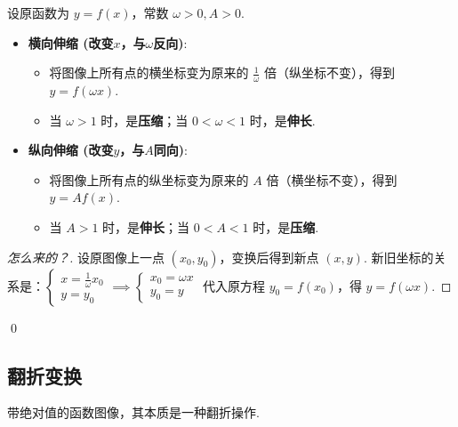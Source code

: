 \begin{theorem}[伸缩变换法则]
	设原函数为 $y=f(x)$，常数 $\omega>0, A>0$.
	\begin{itemize}
		\item \textbf{横向伸缩 (改变$x$，与$\omega$反向)}:
		\begin{itemize}
			\item 将图像上所有点的横坐标变为原来的 $\frac{1}{\omega}$ 倍（纵坐标不变），得到 $y=f(\omega x)$.
			\item 当 $\omega>1$ 时，是\textbf{压缩}；当 $0<\omega<1$ 时，是\textbf{伸长}.
		\end{itemize}
		\item \textbf{纵向伸缩 (改变$y$，与$A$同向)}:
		\begin{itemize}
			\item 将图像上所有点的纵坐标变为原来的 $A$ 倍（横坐标不变），得到 $y=A f(x)$.
			\item 当 $A>1$ 时，是\textbf{伸长}；当 $0<A<1$ 时，是\textbf{压缩}.
		\end{itemize}
	\end{itemize}
\end{theorem}
\begin{proof}[怎么来的？]
	设原图像上一点 $(x_0, y_0)$，变换后得到新点 $(x,y)$.
	新旧坐标的关系是：$\begin{cases} x = \frac{1}{\omega}x_0 \\ y = y_0 \end{cases} \implies \begin{cases} x_0 = \omega x \\ y_0 = y \end{cases}$
	代入原方程 $y_0=f(x_0)$，得 $y=f(\omega x)$.
\end{proof}
\qed

\subsection{翻折变换}
带绝对值的函数图像，其本质是一种翻折操作.

